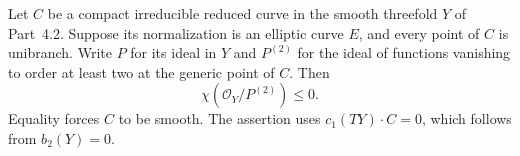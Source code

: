 
\begin{proposition}[P4.30]\hypertarget{tag-02X3}{}\label{night:P4.30}\label{stmt:P4.30}


Let $C$ be a compact irreducible reduced curve in the smooth
threefold $Y$ of Part~4.2. Suppose its normalization is an elliptic
curve $E$, and every point of $C$ is unibranch. Write $P$ for its
ideal in $Y$ and $P^{(2)}$ for the ideal of functions vanishing to
order at least two at the generic point of $C$. Then
\[
 \chi(\mathcal O_Y/P^{(2)})\le0.
\]
Equality forces $C$ to be smooth. The assertion uses
$c_1(TY)\cdot C=0$, which follows from $b_2(Y)=0$.
\end{proposition}


